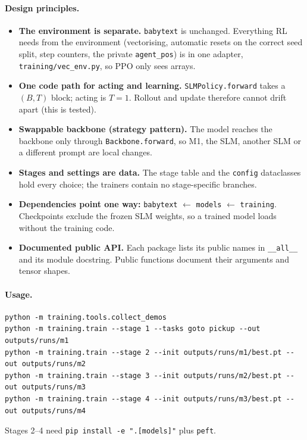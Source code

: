 \documentclass[11pt,a4paper]{article}
\newcommand{\code}[1]{\texttt{\small #1}}
\begin{document}
\paragraph{Design principles.}
\begin{itemize}
  \item \textbf{The environment is separate.} \code{babytext} is unchanged. Everything RL needs from the environment
  (vectorising, automatic resets on the correct seed split, step counters, the private \code{agent\_pos}) is in one
  adapter, \code{training/vec\_env.py}, so PPO only sees arrays.
  \item \textbf{One code path for acting and learning.} \code{SLMPolicy.forward} takes a $(B,T)$ block; acting is
  $T{=}1$. Rollout and update therefore cannot drift apart (this is tested).
  \item \textbf{Swappable backbone (strategy pattern).} The model reaches the backbone only through
  \code{Backbone.forward}, so M1, the SLM, another SLM or a different prompt are local changes.
  \item \textbf{Stages and settings are data.} The stage table and the \code{config} dataclasses hold every choice; the
  trainers contain no stage-specific branches.
  \item \textbf{Dependencies point one way:} \code{babytext} $\leftarrow$ \code{models} $\leftarrow$ \code{training}.
  Checkpoints exclude the frozen SLM weights, so a trained model loads without the training code.
  \item \textbf{Documented public API.} Each package lists its public names in \code{\_\_all\_\_} and its module
  docstring. Public functions document their arguments and tensor shapes.
\end{itemize}

\paragraph{Usage.}
\begin{lstlisting}
python -m training.tools.collect_demos
python -m training.train --stage 1 --tasks goto pickup --out outputs/runs/m1
python -m training.train --stage 2 --init outputs/runs/m1/best.pt --out outputs/runs/m2
python -m training.train --stage 3 --init outputs/runs/m2/best.pt --out outputs/runs/m3
python -m training.train --stage 4 --init outputs/runs/m3/best.pt --out outputs/runs/m4
\end{lstlisting}
Stages 2--4 need \code{pip install -e ".[models]"} plus \code{peft}.
\end{document}
